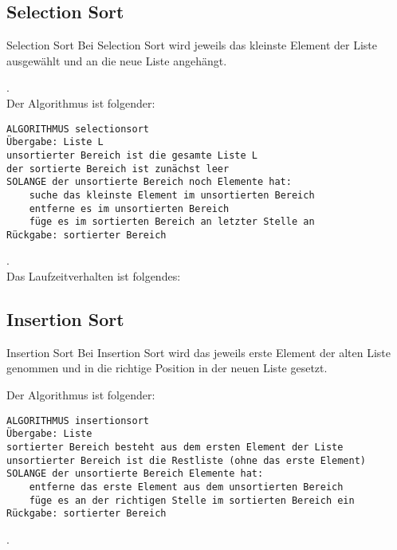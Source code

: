 \subsection{Selection Sort}
\begin{zitat}{Selection Sort}
Bei Selection Sort wird jeweils das kleinste Element der Liste ausgewählt und an die neue Liste angehängt.
\end{zitat}
.\\
Der Algorithmus ist folgender:
\begin{lstlisting}
ALGORITHMUS selectionsort
Übergabe: Liste L
unsortierter Bereich ist die gesamte Liste L
der sortierte Bereich ist zunächst leer
SOLANGE der unsortierte Bereich noch Elemente hat:
    suche das kleinste Element im unsortierten Bereich
    entferne es im unsortierten Bereich
    füge es im sortierten Bereich an letzter Stelle an
Rückgabe: sortierter Bereich
\end{lstlisting}
.\\
Das Laufzeitverhalten ist folgendes:
\begin{table}[h]
\label{tab:my-table}
\end{table}

\subsection{Insertion Sort}

\begin{zitat}{Insertion Sort}
Bei Insertion Sort wird das jeweils erste Element der alten Liste genommen und in die richtige Position in der neuen Liste gesetzt.
\end{zitat}
Der Algorithmus ist folgender:
\begin{lstlisting}
ALGORITHMUS insertionsort
Übergabe: Liste
sortierter Bereich besteht aus dem ersten Element der Liste
unsortierter Bereich ist die Restliste (ohne das erste Element)
SOLANGE der unsortierte Bereich Elemente hat:
    entferne das erste Element aus dem unsortierten Bereich
    füge es an der richtigen Stelle im sortierten Bereich ein
Rückgabe: sortierter Bereich
\end{lstlisting}
.\\

